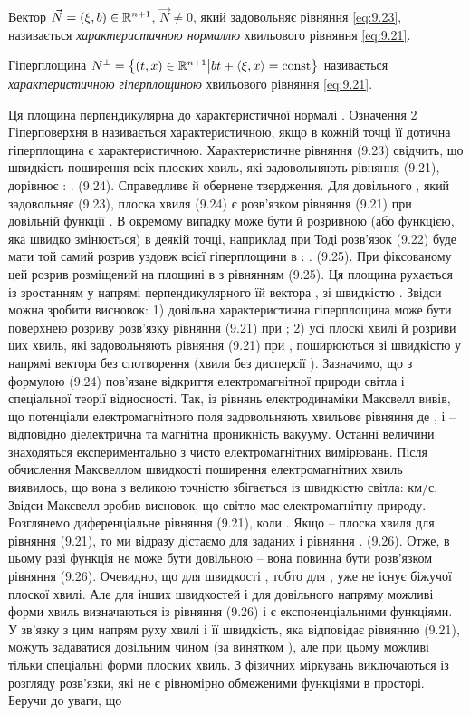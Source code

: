 \begin{definition}
    Вектор $\vec N = (\xi, b) \in \mathbb{R}^{n + 1}$, $\vec N \ne 0$, який задовольняє рівняння \eqref{eq:9.23}, називається \textit{характеристичною нормаллю} хвильового рівняння \eqref{eq:9.21}.
\end{definition}

\begin{definition}
    Гіперплощина $N^\perp = \left\{(t, x) \in \RR^{n + 1} \middle| b t + \langle \xi, x \rangle = \const \right\}$ називається \textit{характеристичною гіперплощиною} хвильового рівняння \eqref{eq:9.21}.
\end{definition}
 
Ця площина перпендикулярна до характеристичної нормалі  .
Означення 2 Гіперповерхня в   називається характеристичною, якщо в кожній точці її дотична гіперплощина є характеристичною.
Характеристичне рівняння (9.23) свідчить, що швидкість поширення всіх плоских хвиль, які задовольняють рівняння (9.21), дорівнює  :
 .                                  (9.24).
Справедливе й обернене твердження. Для довільного  , який задовольняє (9.23), плоска хвиля (9.24) є розв’язком рівняння (9.21) при довільній функції  . 
В окремому випадку   може бути й розривною (або функцією, яка швидко змінюється) в деякій точці, наприклад при   Тоді розв’язок (9.22) буде мати той самий розрив уздовж всієї гіперплощини в  :
 .                                  (9.25).
При фіксованому   цей розрив розміщений на площині в   з рівнянням (9.25). Ця площина рухається із зростанням   у напрямі перпендикулярного їй вектора  , зі швидкістю  .
Звідси можна зробити висновок:
1) довільна характеристична гіперплощина може бути поверхнею розриву розв’язку рівняння (9.21) при  ;
2) усі плоскі хвилі й розриви цих хвиль, які задовольняють рівняння (9.21) при  , поширюються зі швидкістю   у напрямі вектора   без спотворення (хвиля без дисперсії ).
Зазначимо, що з формулою (9.24) пов’язане відкриття електромагнітної природи світла і спеціальної теорії відносності. Так, із рівнянь електродинаміки Максвелл вивів, що потенціали електромагнітного поля задовольняють хвильове рівняння   де  ,   і   – відповідно діелектрична та магнітна проникність вакууму. Останні величини знаходяться експериментально з чисто електромагнітних вимірювань. Після обчислення Максвеллом швидкості поширення електромагнітних хвиль виявилось, що вона з великою точністю збігається із швидкістю світла:   км/с. Звідси Максвелл зробив висновок, що світло має електромагнітну природу.
Розглянемо диференціальне рівняння (9.21), коли  . Якщо   – плоска хвиля для рівняння (9.21), то ми відразу дістаємо для заданих   і   рівняння 
 .          (9.26).
Отже, в цьому разі функція   не може бути довільною – вона повинна бути розв’язком рівняння (9.26). Очевидно, що для швидкості  , тобто для  , уже не існує біжучої плоскої хвилі. Але для інших швидкостей і для довільного напряму можливі форми хвиль визначаються із рівняння (9.26) і є експоненціальними функціями. У зв’язку з цим напрям руху хвилі і її швидкість, яка відповідає рівнянню (9.21), можуть задаватися довільним чином (за винятком  ), але при цьому можливі тільки спеціальні форми плоских хвиль. З фізичних міркувань виключаються із розгляду розв’язки, які не є рівномірно обмеженими функціями в просторі. Беручи до уваги, що
 
